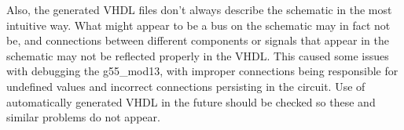 \documentclass[12pt]{article}
\begin{document}
Also, the generated VHDL files don't always describe the schematic in the most intuitive way. What might appear to be a bus on the schematic may in fact not be, and connections between different components or signals that appear in the schematic may not be reflected properly in the VHDL. This caused some issues with debugging the g55\_mod13, with improper connections being responsible for undefined values and incorrect connections persisting in the circuit. Use of automatically generated VHDL in the future should be checked so these and similar problems do not appear.
\end{document}
